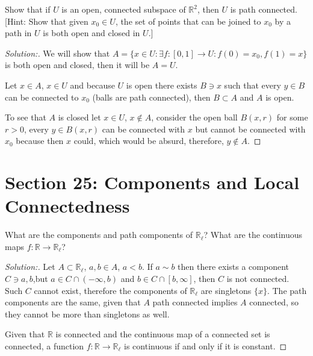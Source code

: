 \documentclass[a4paper,12pt, reqno]{article}
\theoremstyle{definition}
\newenvironment{exerr}[1]{
  \renewcommand\theexeralt{#1}
  \exeralt
}{\endexeralt}
\newenvironment{solution}{\begin{proof}[Solution:]}{\end{proof}}
\newcommand{\R}{\mathbb{R}}
\begin{document}
\begin{exerr}{10}
  Show that if $U$ is an open, connected subspace of $\R^2$, then $U$ is path connected. [Hint: Show that given $x_{0}\in U$, the set of points that can be joined to $x_{0}$ by a path in $U$ is both open and closed in $U$.]
\end{exerr}
\begin{solution}
  We will show that $A = \{ x\in U : \exists f:[0,1]\to U : f(0)=x_{0},f(1)=x \}$ is both open and closed, then it will be $A = U$.

  Let $x\in A$, $x\in U$ and because $U$ is open there exists $B\ni x$ such that every $y\in B$ can be connected to $x_{0}$ (balls are path connected), then $B\subset A$ and $A$ is open.
  
  To see that $A$ is closed let $x\in U$, $x\notin A$, consider the open ball $B(x,r)$ for some $r>0$, every $y\in B(x,r)$ can be connected with $x$ but cannot be connected with $x_{0}$ because then $x$ could, which would be absurd, therefore, $y\notin A$.
\end{solution}

\section*{Section 25: Components and Local Connectedness}

\begin{exerr}{1}
  What are the components and path components of $\R_{\ell}$? What are the continuous maps $f:\R\to\R_{\ell}$?
\end{exerr}
\begin{solution}
  Let $A\subset\R_{\ell}$, $a,b\in A$, $a<b$. If $a\sim b$ then there exists a  component $C\ni a,b$,but $a\in C\cap(-\infty,b)$ and $b\in C\cap[b,\infty]$, then $C$ is not connected. Such $C$ cannot exist, therefore the  components of $\R_{\ell}$ are singletons $\{ x \}$. The path components are the same, given that $A$ path connected implies $A$ connected, so they cannot be more than singletons as well.

  Given that $\R$ is connected and the continuous map of a connected set is connected, a function $f:\R\to\R_{\ell}$ is continuous if and only if it is constant.
\end{solution}
\end{document}
